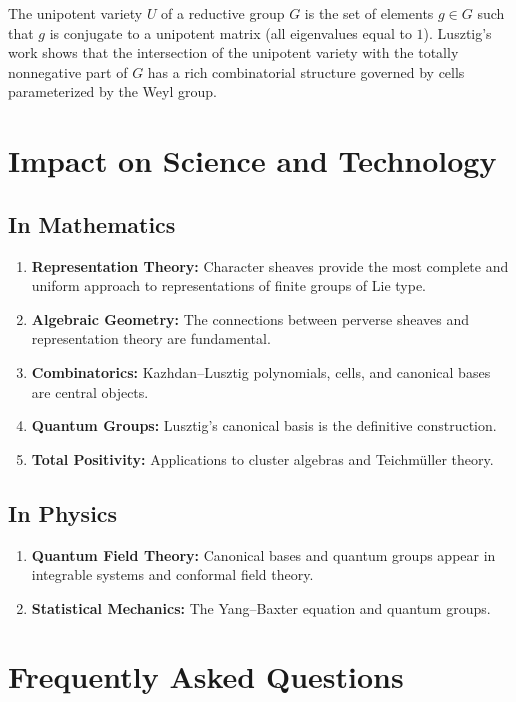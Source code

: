 \begin{remark}
The unipotent variety $U$ of a reductive group $G$ is the set of elements $g \in G$ such that $g$ is conjugate to a unipotent matrix (all eigenvalues equal to $1$). Lusztig's work shows that the intersection of the unipotent variety with the totally nonnegative part of $G$ has a rich combinatorial structure governed by cells parameterized by the Weyl group.
\end{remark}

\section{Impact on Science and Technology}

\subsection{In Mathematics}

\begin{enumerate}
    \item \textbf{Representation Theory:} Character sheaves provide the most complete and uniform approach to representations of finite groups of Lie type.
    \item \textbf{Algebraic Geometry:} The connections between perverse sheaves and representation theory are fundamental.
    \item \textbf{Combinatorics:} Kazhdan--Lusztig polynomials, cells, and canonical bases are central objects.
    \item \textbf{Quantum Groups:} Lusztig's canonical basis is the definitive construction.
    \item \textbf{Total Positivity:} Applications to cluster algebras and Teichm\"uller theory.
\end{enumerate}

\subsection{In Physics}

\begin{enumerate}
    \item \textbf{Quantum Field Theory:} Canonical bases and quantum groups appear in integrable systems and conformal field theory.
    \item \textbf{Statistical Mechanics:} The Yang--Baxter equation and quantum groups.
\end{enumerate}

\section{Frequently Asked Questions}

